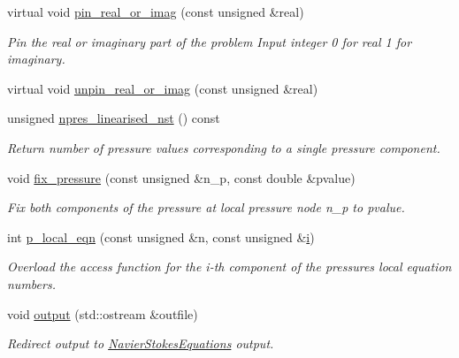\begin{DoxyCompactItemize}
virtual void \hyperlink{classoomph_1_1LinearisedQTaylorHoodElement_a84bb4ee14849c6ed91b0005b1c9b06dc}{pin\+\_\+real\+\_\+or\+\_\+imag} (const unsigned \&real)
\begin{DoxyCompactList}\small\item\em Pin the real or imaginary part of the problem Input integer 0 for real 1 for imaginary. \end{DoxyCompactList}\item 
virtual void \hyperlink{classoomph_1_1LinearisedQTaylorHoodElement_aed1b1549f18cc58931bf86b67ac9e6a2}{unpin\+\_\+real\+\_\+or\+\_\+imag} (const unsigned \&real)
\item 
unsigned \hyperlink{classoomph_1_1LinearisedQTaylorHoodElement_a39fbc88bf3d2d013337c1a5009e0168f}{npres\+\_\+linearised\+\_\+nst} () const
\begin{DoxyCompactList}\small\item\em Return number of pressure values corresponding to a single pressure component. \end{DoxyCompactList}\item 
void \hyperlink{classoomph_1_1LinearisedQTaylorHoodElement_a09568188690809c7ef85f4e524c4ee7c}{fix\+\_\+pressure} (const unsigned \&n\+\_\+p, const double \&pvalue)
\begin{DoxyCompactList}\small\item\em Fix both components of the pressure at local pressure node n\+\_\+p to pvalue. \end{DoxyCompactList}\item 
int \hyperlink{classoomph_1_1LinearisedQTaylorHoodElement_add790a7adf9472c27b4da3c0f6c9e4a5}{p\+\_\+local\+\_\+eqn} (const unsigned \&n, const unsigned \&\hyperlink{cfortran_8h_adb50e893b86b3e55e751a42eab3cba82}{i})
\begin{DoxyCompactList}\small\item\em Overload the access function for the i-\/th component of the pressure\textquotesingle{}s local equation numbers. \end{DoxyCompactList}\item 
void \hyperlink{classoomph_1_1LinearisedQTaylorHoodElement_a0a51768cb37a15ede6bc402a2c22e718}{output} (std\+::ostream \&outfile)
\begin{DoxyCompactList}\small\item\em Redirect output to \hyperlink{classoomph_1_1NavierStokesEquations}{Navier\+Stokes\+Equations} output. \end{DoxyCompactList}\item 

\end{DoxyCompactItemize}
